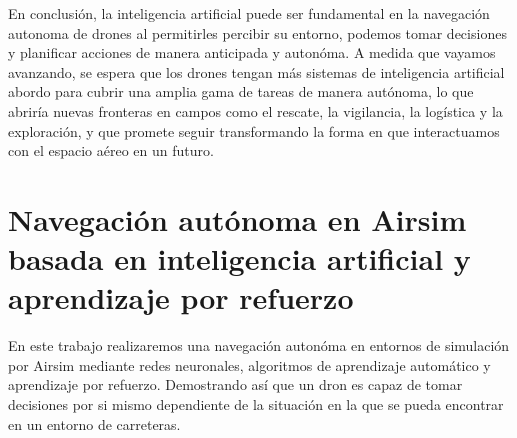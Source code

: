 En conclusión, la inteligencia artificial puede ser fundamental en la navegación autonoma de drones al permitirles percibir su entorno, podemos tomar decisiones y planificar acciones 
de manera anticipada y autonóma. A medida que vayamos avanzando, se espera que los drones tengan más sistemas de inteligencia artificial abordo para cubrir una amplia gama de tareas
de manera autónoma, lo que abriría nuevas fronteras en campos como el rescate, la vigilancia, la logística y la exploración, y que promete seguir transformando la forma en que 
interactuamos con el espacio aéreo en un futuro. 

\newpage
\section{Navegación autónoma en Airsim basada en inteligencia artificial y aprendizaje por refuerzo}
\label{sec:Navegación autónoma}

En este trabajo realizaremos una navegación autonóma en entornos de simulación por Airsim mediante redes neuronales, algoritmos de aprendizaje automático y aprendizaje 
por refuerzo. Demostrando así que un dron es capaz de tomar decisiones por si mismo dependiente de la situación en la que se pueda encontrar en un entorno de carreteras.

